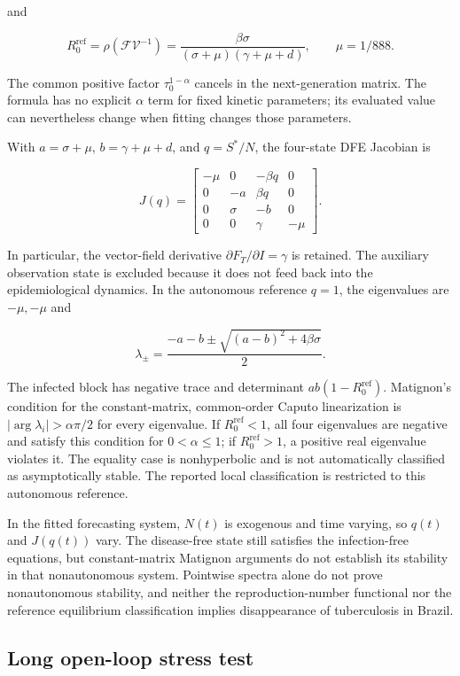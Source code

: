 \documentclass[pdflatex,sn-mathphys-ay]{sn-jnl}
\begin{document}
and

\[
R_0^{\mathrm{ref}}=\rho(\mathcal F\mathcal V^{-1})=\frac{\beta\sigma}{(\sigma+\mu)(\gamma+\mu+d)},\qquad\mu=1/888.
\]

The common positive factor $\tau_0^{1-\alpha}$ cancels in the next-generation matrix. The formula has no explicit $\alpha$ term for fixed kinetic parameters; its evaluated value can nevertheless change when fitting changes those parameters.

With $a=\sigma+\mu$, $b=\gamma+\mu+d$, and $q=S^*/N$, the four-state DFE Jacobian is

\[
J(q)=\begin{bmatrix}
-\mu&0&-\beta q&0\\
0&-a&\beta q&0\\
0&\sigma&-b&0\\
0&0&\gamma&-\mu
\end{bmatrix}.
\]

In particular, the vector-field derivative $\partial F_T/\partial I=\gamma$ is retained. The auxiliary observation state is excluded because it does not feed back into the epidemiological dynamics. In the autonomous reference $q=1$, the eigenvalues are $-\mu,-\mu$ and

\[
\lambda_{\pm}=\frac{-a-b\pm\sqrt{(a-b)^2+4\beta\sigma}}{2}.
\]

The infected block has negative trace and determinant $ab(1-R_0^{\mathrm{ref}})$. Matignon's condition for the constant-matrix, common-order Caputo linearization is $|\arg\lambda_i|>\alpha\pi/2$ for every eigenvalue. If $R_0^{\mathrm{ref}}<1$, all four eigenvalues are negative and satisfy this condition for $0<\alpha\le1$; if $R_0^{\mathrm{ref}}>1$, a positive real eigenvalue violates it. The equality case is nonhyperbolic and is not automatically classified as asymptotically stable. The reported local classification is restricted to this autonomous reference.

In the fitted forecasting system, $N(t)$ is exogenous and time varying, so $q(t)$ and $J(q(t))$ vary. The disease-free state still satisfies the infection-free equations, but constant-matrix Matignon arguments do not establish its stability in that nonautonomous system. Pointwise spectra alone do not prove nonautonomous stability, and neither the reproduction-number functional nor the reference equilibrium classification implies disappearance of tuberculosis in Brazil.

\subsection{Long open-loop stress test}
\end{document}
